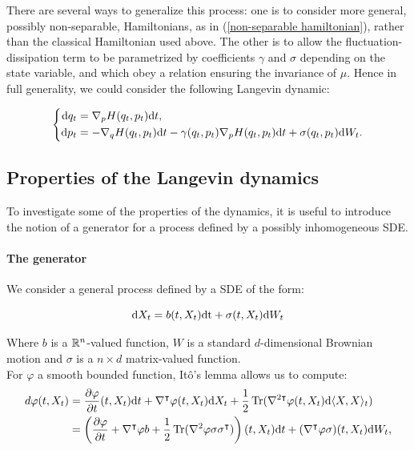 \begin{remark}
    There are several ways to generalize this process: one is to consider more general, possibly non-separable, Hamiltonians, as in (\ref{non-separable hamiltonian}), rather than the classical Hamiltonian used above.
    The other is to allow the fluctuation-dissipation term to be parametrized by coefficients $\gamma$ and $\sigma$ depending on the state variable, and which obey a relation ensuring the invariance of $\mu$.
    Hence in full generality, we could consider the following Langevin dynamic:
    
    \begin{equation}
        \label{general Langevin}
        \left\{\begin{aligned}
            \text dq_t &=\nabla_p H(q_t,p_t)\text{d}t,\\
            \text dp_t &= -\nabla_q H(q_t,p_t)\text{d}t -\gamma(q_t,p_t)\nabla_pH(q_t,p_t)\text{d}t+\sigma(q_t,p_t)\text dW_t.
        \end{aligned}\right.
    \end{equation}
\end{remark}



\subsection{Properties of the Langevin dynamics}

To investigate some of the properties of the dynamics, it is useful to introduce the notion of a generator for a process defined by a possibly inhomogeneous SDE.
\paragraph{The generator}
We consider a general process defined by a SDE of the form:

\begin{equation}
    \label{SDE}
    \text dX_t=b(t,X_t)\text {\text{d}t} + \sigma(t,X_t)\text dW_t
\end{equation}

Where $b$ is a $\mathbb{R}^n$-valued function, $W$ is a standard $d$-dimensional Brownian motion and $\sigma$ is a $n\times d$ matrix-valued function.\\
For $\varphi$ a smooth bounded function, Itô's lemma allows us to compute:
\begin{align*}
    d\varphi(t,X_t) &=\frac{\partial \varphi}{\partial t}(t,X_t)\text dt + \nabla^\intercal \varphi(t,X_t) \text dX_t + \frac12 \operatorname{Tr}(\nabla^{2\intercal}\varphi(t,X_t)\text d\langle X ,X\rangle _t)\\
    &=\left( \frac{\partial \varphi}{\partial t} + \nabla^{\intercal}\varphi b + \frac12 \operatorname{Tr}(\nabla^2\varphi \sigma\sigma^\intercal) \right)(t,X_t) \text dt+ (\nabla^\intercal \varphi\sigma )(t,X_t)\text dW_t,
\end{align*}

